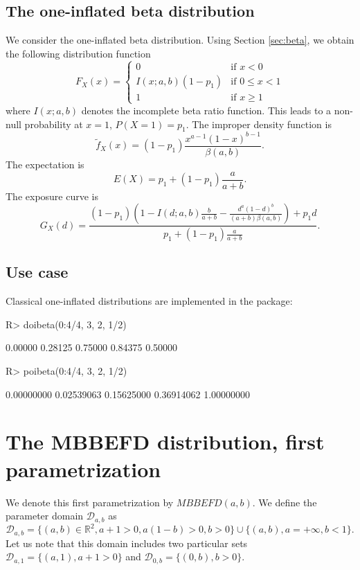 \documentclass[article, nojss]{jss}
\newcommand{\R}{\mathbb R}
\newcommand{\calD}{\mathcal D}
\newcommand{\systL}{\left\{\begin{array}{ll}}
\newcommand{\systR}{\end{array}\right.}
\begin{document}
\subsection{The one-inflated beta distribution}
We consider the one-inflated beta distribution.
Using Section \ref{sec:beta}, we obtain the following distribution function
$$
F_X(x) = 
\systL
0 & \text{if } x<0 \\
I(x;a,b)(1-p_1) & \text{if } 0\leq x <1 \\
1 & \text{if } x\geq 1
\systR
$$
where $I(x;a,b)$ denotes the incomplete beta ratio function.
This leads to a non-null probability at $x=1$, $P(X=1)=p_1$.
The improper density function is 
$$
\tilde f_X(x) = (1-p_1) \frac{x^{a-1}(1-x)^{b-1}}{\beta(a,b)}.
$$
The expectation is
$$
E(X) 
= p_1 + (1-p_1)\frac{a}{a+b}.
$$
The exposure curve is 
$$
G_X(d) =  
\frac{(1-p_1) \left(1 - I(d;a,b) \frac{b}{a+b} - \frac{d^a(1-d)^b}{(a+b)\beta(a,b)}\right) + p_1d
}{p_1 + (1-p_1)\frac{a}{a+b}}.
$$


\subsection{Use case}
Classical one-inflated distributions are implemented in the package:
\begin{Schunk}
\begin{Sinput}
R> doibeta(0:4/4, 3, 2, 1/2)
\end{Sinput}
\begin{Soutput}
[1] 0.00000 0.28125 0.75000 0.84375 0.50000
\end{Soutput}
\begin{Sinput}
R> poibeta(0:4/4, 3, 2, 1/2)
\end{Sinput}
\begin{Soutput}
[1] 0.00000000 0.02539063 0.15625000 0.36914062 1.00000000
\end{Soutput}
\end{Schunk}



\section{The MBBEFD distribution, first parametrization}

We denote this first parametrization by $MBBEFD(a,b)$.
We define the parameter domain $\calD_{a,b}$ as 
\begin{equation}
\calD_{a,b} = \{(a,b)\in\R^2, a+1>0, a(1-b)>0, b>0\}
\cup \{(a,b), a=+\infty, b<1\}.
\label{eq:paramdomain:mbbefd:ab}
\end{equation}
Let us note that this domain includes two particular sets $\calD_{a,1}=\{(a,1), a+1>0\}$ and $\calD_{0,b}=\{(0,b), b>0\}$.
\end{document}
